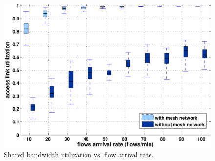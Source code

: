 \begin{figure}[h]
\begin{center}
\includegraphics[width=1\linewidth]{../../results/simulation/boxplot2.pdf}  
\caption{Shared bandwidth utilization vs. flow arrival rate.}
\label{fig:utilization_arrival}
\end{center}
\end{figure}


